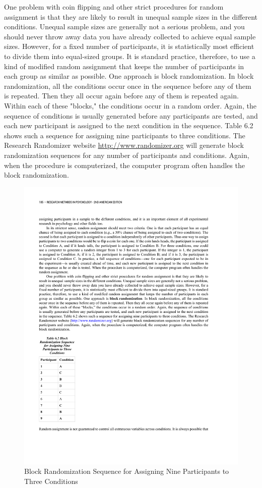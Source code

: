 One problem with coin flipping and other strict procedures for random assignment is that they are likely to result in unequal sample sizes in the different conditions. Unequal sample sizes are generally not a serious problem, and you should never throw away data you have already collected to achieve equal sample sizes. However, for a fixed number of participants, it is statistically most efficient to divide them into equal-sized groups. It is standard practice, therefore, to use a kind of modified random assignment that keeps the number of participants in each group as similar as possible. One approach is block randomization. In block randomization, all the conditions occur once in the sequence before any of them is repeated. Then they all occur again before any of them is repeated again. Within each of these "blocks," the conditions occur in a random order. Again, the sequence of conditions is usually generated before any participants are tested, and each new participant is assigned to the next condition in the sequence. Table 6.2 shows such a sequence for assigning nine participants to three conditions. The Research Randomizer website \url{http://www.randomizer.org} will generate block randomization sequences for any number of participants and conditions. Again, when the procedure is computerized, the computer program often handles the block randomization.
\begin{figure}[0in]
       \includegraphics[width=\linewidth]{figures/C6blockRandomization.pdf}
       \caption{Block Randomization Sequence for Assigning Nine Participants to Three Conditions}
       \label{fig:Bargraph}
 \end{figure}


